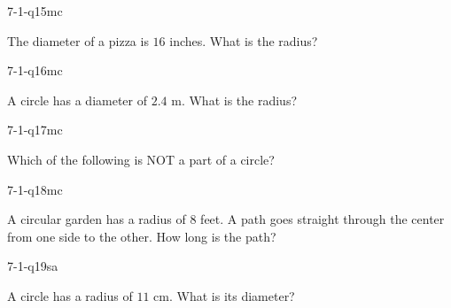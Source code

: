 \begin{practiceQuestion}{7-1-q15}{mc}
\begin{questionText}
The diameter of a pizza is $16$ inches. What is the radius?
\end{questionText}
\end{practiceQuestion}

\begin{practiceQuestion}{7-1-q16}{mc}
\begin{questionText}
A circle has a diameter of $2.4$ m. What is the radius?
\end{questionText}
\end{practiceQuestion}

\begin{practiceQuestion}{7-1-q17}{mc}
\begin{questionText}
Which of the following is NOT a part of a circle?
\end{questionText}
\end{practiceQuestion}

\begin{practiceQuestion}{7-1-q18}{mc}
\begin{questionText}
A circular garden has a radius of $8$ feet. A path goes straight through the center from one side to the other. How long is the path?
\end{questionText}
\end{practiceQuestion}


\begin{practiceQuestion}{7-1-q19}{sa}
\begin{questionText}
A circle has a radius of $11$ cm. What is its diameter?
\end{questionText}
\end{practiceQuestion}

